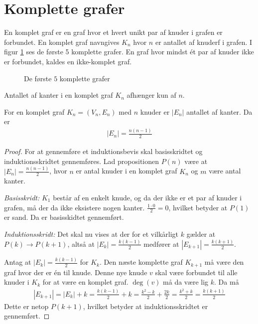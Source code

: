 \section{Komplette grafer}
En komplet graf er en graf hvor et hvert unikt par af knuder i grafen er forbundet.
En komplet graf navngives $K_n$ hvor $n$ er antallet af knuderf i grafen.
I figur \ref{fig:komplette_grafer} ses de første 5 komplette grafer.
En graf hvor mindst ét par af knuder ikke er forbundet, kaldes en ikke-komplet graf.

\begin{figure}[h]
	\centering
	
	\caption{De første $5$ komplette grafer} \label{fig:komplette_grafer}
\end{figure}

Antallet af kanter i en komplet graf $K_n$ afhænger kun af $n$.

\begin{thm}
	For en komplet graf $K_n = (V_n, E_n)$ med $n$ knuder er $|E_n|$ antallet af kanter. Da er
	\begin{align*}
		|E_n| = \frac{n (n - 1)}{2}
	\end{align*}
\end{thm}
\begin{proof}
	For at gennemføre et induktionsbevis skal basisskridtet og induktionsskridtet gennemføres.
	Lad propositionen $P(n)$ være at $|E_n|= \frac{n (n - 1)}{2}$, hvor $n$ er antal knuder i en komplet graf $K_n$ og $m$ være antal kanter.

	\textit{Basisskridt:} $K_1$ består af en enkelt knude, og da der ikke er et par af knuder i grafen, må der da ikke eksistere nogen kanter.
	$\frac{ 1 \cdot 0}{2} = 0$, hvilket betyder at $P(1)$ er sand. Da er basisskidtet gennemført.

	\textit{Induktionsskridt:} Det skal nu vises at der for et vilkårligt $k$ gælder at $P(k) \to P(k + 1)$, altså at $|E_k| = \frac{k (k - 1)}{2}$ medfører at $|E_{k+1}| = \frac{k (k + 1)}{2}$.

	Antag at $|E_k| = \frac{k (k - 1)}{2}$ for $K_k$.
	Den næste komplette graf $K_{k+1}$ må være den graf hvor der er én til knude. Denne nye knude $v$ skal være forbundet til alle knuder i $K_k$ for at være en komplet graf. $\deg (v)$ må da være lig $k$. Da må
	\begin{align*}
		|E_{k+1}| 
		= |E_k| + k
		= \frac{k (k - 1)}{2} + k
		= \frac{k^2 - k}{2} + \frac{2k}{2}
		= \frac{k^2 + k}{2} 
		= \frac{k (k + 1)}{2}
	\end{align*}
	Dette er netop $P(k + 1)$, hvilket betyder at induktionsskridtet er gennemført.
\end{proof}

